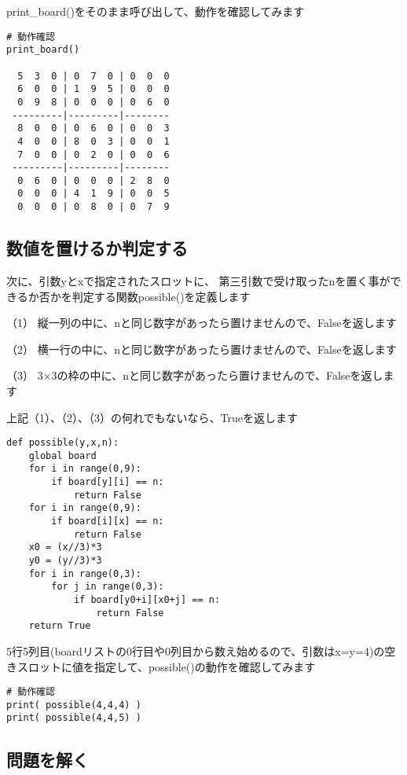 \documentclass[uplatex,a4paper,11pt,oneside,openany]{jsbook}
\begin{document}
print\_board()をそのまま呼び出して、動作を確認してみます

\begin{verbatim}
# 動作確認
print_board()

  5  3  0 | 0  7  0 | 0  0  0
  6  0  0 | 1  9  5 | 0  0  0
  0  9  8 | 0  0  0 | 0  6  0
 ---------|---------|--------
  8  0  0 | 0  6  0 | 0  0  3
  4  0  0 | 8  0  3 | 0  0  1
  7  0  0 | 0  2  0 | 0  0  6
 ---------|---------|--------
  0  6  0 | 0  0  0 | 2  8  0
  0  0  0 | 4  1  9 | 0  0  5
  0  0  0 | 0  8  0 | 0  7  9
\end{verbatim}

\subsection{数値を置けるか判定する}

次に、引数yとxで指定されたスロットに、
第三引数で受け取ったnを置く事ができるか否かを判定する関数possible()を定義します

（1） 縦一列の中に、nと同じ数字があったら置けませんので、Falseを返します

（2） 横一行の中に、nと同じ数字があったら置けませんので、Falseを返します

（3） 3$\times$3の枠の中に、nと同じ数字があったら置けませんので、Falseを返します

上記（1）、（2）、（3）の何れでもないなら、Trueを返します

\begin{lstlisting}[caption=possible,label=sudoku02]
def possible(y,x,n):
    global board
    for i in range(0,9):
        if board[y][i] == n:
            return False
    for i in range(0,9):
        if board[i][x] == n:
            return False
    x0 = (x//3)*3
    y0 = (y//3)*3
    for i in range(0,3):
        for j in range(0,3):
            if board[y0+i][x0+j] == n:
                return False
    return True

\end{lstlisting}

5行5列目(boardリストの0行目や0列目から数え始めるので、引数はx=y=4)の空きスロットに値を指定して、possible()の動作を確認してみます

\begin{verbatim}
# 動作確認
print( possible(4,4,4) )
print( possible(4,4,5) )
\end{verbatim}

\subsection{問題を解く}
\end{document}
